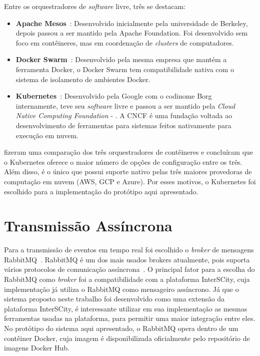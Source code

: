 Entre os orquestradores de \textit{software} livre, três se destacam:

\begin{itemize}
    \item \textbf{Apache Mesos}~\citep{Mesos}: Desenvolvido inicialmente pela universidade de Berkeley, depois passou a ser mantido pela Apache Foundation. Foi desenvolvido sem foco em contêineres, mas em coordenação de \textit{clusters} de computadores.
    \item \textbf{Docker Swarm}~\cite{Swarm}: Desenvolvido pela mesma empresa que mantém a ferramenta Docker, o Docker Swarm tem compatibilidade nativa com o sistema de isolamento de ambientes Docker.
    \item \textbf{Kubernetes}~\citep{Kubernetes}: Desenvolvido pela Google com o codinome Borg internamente, teve seu \textit{software} livre e passou a ser mantido pela \textit{Cloud Native Computing Foundation} - \cite{cnfc}. A CNCF é uma fundação voltada ao desenvolvimento de ferramentas para sistemas feitos nativamente para execução em nuvem.
\end{itemize}  
    
\cite{Truyen_2019} fizeram uma comparação dos três orquestradores de contêineres e concluíram que o Kubernetes oferece o maior número de opções de configuração entre os três. Além disso, é o único que possui suporte nativo pelas três maiores provedoras de computação em nuvem (AWS, GCP e Azure). Por esses motivos, o Kubernetes foi escolhido para a implementação do protótipo aqui apresentado.


\section{Transmissão Assíncrona}

Para a transmissão de eventos em tempo real foi escolhido o \textit{broker} de mensagens RabbitMQ~\citep{RabbitMq}. RabbitMQ é um dos mais usados brokers atualmente, pois suporta vários protocolos de comunicação assíncrona~\citep{Dobbelaere:2017:KVR:3093742.3093908}. O principal fator para a escolha do RabbitMQ como \textit{broker} foi a compatibilidade com a plataforma InterSCity, cuja implementação já utiliza o RabbitMQ como mensageiro assíncrono. Já que o sistema proposto neste trabalho foi desenvolvido como uma extensão da plataforma InterSCity, é interessante utilizar em sua implementação as mesmas ferramentas usadas na plataforma, para permitir uma maior integração entre eles.
No protótipo do sistema aqui apresentado, o RabbitMQ opera dentro de um contêiner Docker, cuja imagem é disponibilizada oficialmente pelo repositório de imagens Docker Hub. 



